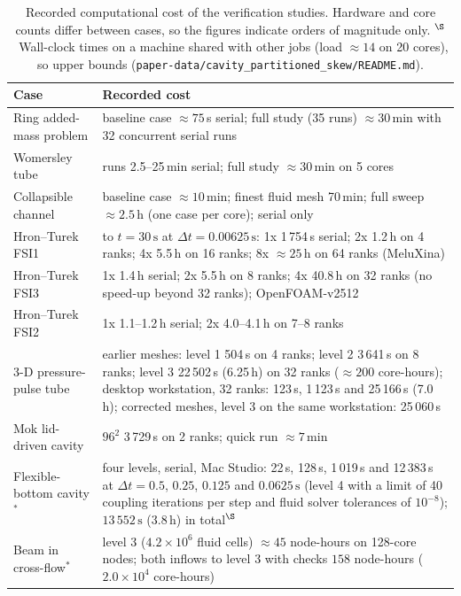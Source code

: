 \begin{table}[htbp]
	\centering
	\footnotesize
	\setlength{\tabcolsep}{3pt}
	\caption{Recorded computational cost of the verification studies. Hardware and core counts differ between cases, so the figures indicate orders of magnitude only. $^\S$~Wall-clock times on a machine shared with other jobs (load $\approx14$ on 20 cores), so upper bounds (\texttt{paper-data/cavity\_partitioned\_skew/README.md}).}
	\label{tab:cost}
	\begin{tabular}{p{3.0cm}p{10.8cm}}
		\toprule
		Case & Recorded cost \\
		\midrule
		Ring added-mass problem & baseline case $\approx75$\,s serial; full study (35 runs) $\approx30$\,min with 32 concurrent serial runs \\
		Womersley tube & runs 2.5--25\,min serial; full study $\approx30$\,min on 5 cores \\
		Collapsible channel & baseline case $\approx10$\,min; finest fluid mesh 70\,min; full sweep $\approx2.5$\,h (one case per core); serial only \\
		Hron--Turek FSI1 & to $t = 30\,\mathrm{s}$ at $\Delta t = 0.00625\,\mathrm{s}$: 1x 1\,754\,s serial; 2x 1.2\,h on 4 ranks; 4x 5.5\,h on 16 ranks; 8x $\approx25$\,h on 64 ranks (MeluXina) \\
		Hron--Turek FSI3 & 1x 1.4\,h serial; 2x 5.5\,h on 8 ranks; 4x 40.8\,h on 32 ranks (no speed-up beyond 32 ranks); OpenFOAM-v2512 \\
		Hron--Turek FSI2 & 1x 1.1--1.2\,h serial; 2x 4.0--4.1\,h on 7--8 ranks \\
		3-D pressure-pulse tube & earlier meshes: level 1 504\,s on 4 ranks; level 2 3\,641\,s on 8 ranks; level 3 22\,502\,s (6.25\,h) on 32 ranks ($\approx200$ core-hours); desktop workstation, 32 ranks: 123\,s, 1\,123\,s and 25\,166\,s (7.0\,h); corrected meshes, level 3 on the same workstation: 25\,060\,s \\
		Mok lid-driven cavity & $96^2$ 3\,729\,s on 2 ranks; quick run $\approx7$\,min \\
		Flexible-bottom cavity$^\ast$ & four levels, serial, Mac Studio: 22\,s, 128\,s, 1\,019\,s and 12\,383\,s at $\Delta t = 0.5$, $0.25$, $0.125$ and $0.0625\,\mathrm{s}$ (level 4 with a limit of 40 coupling iterations per step and fluid solver tolerances of $10^{-8}$); $13\,552\,\mathrm{s}$ ($3.8$\,h) in total$^\S$ \\
		Beam in cross-flow$^\ast$ & level 3 ($4.2\times10^{6}$ fluid cells) $\approx45$ node-hours on 128-core nodes; both inflows to level 3 with checks $158$ node-hours ($2.0\times10^{4}$ core-hours) \\

\end{tabular}
\end{table}
